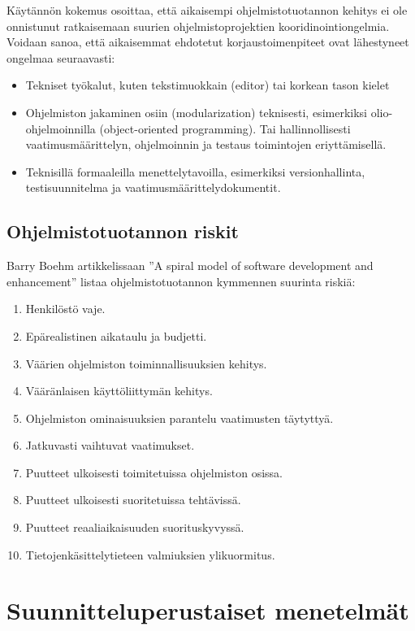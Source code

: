 \documentclass[finnish]{tktltiki2}
\theoremstyle{definition}
\theoremstyle{remark}
\begin{document}
Käytännön kokemus osoittaa, että aikaisempi ohjelmistotuotannon kehitys ei ole onnistunut ratkaisemaan suurien ohjelmistoprojektien kooridinointiongelmia. 
Voidaan sanoa, että aikaisemmat ehdotetut korjaustoimenpiteet ovat lähestyneet ongelmaa seuraavasti: 
\begin{itemize}
 \item Tekniset työkalut, kuten tekstimuokkain (editor) tai korkean tason kielet
 \item Ohjelmiston jakaminen osiin (modularization) teknisesti, esimerkiksi olio-ohjelmoinnilla (object-oriented programming). Tai hallinnollisesti vaatimusmäärittelyn, ohjelmoinnin ja testaus toimintojen eriyttämisellä.
 \item Teknisillä formaaleilla menettelytavoilla, esimerkiksi versionhallinta, testisuunnitelma ja vaatimusmäärittelydokumentit\cite{KES95}.
\end{itemize}

\subsection{Ohjelmistotuotannon riskit}

Barry Boehm artikkelissaan ''A spiral model of software development and enhancement'' listaa ohjelmistotuotannon kymmennen suurinta riskiä: 

\begin{enumerate}
  \item Henkilöstö vaje.
  \item Epärealistinen aikataulu ja budjetti.
  \item Väärien ohjelmiston toiminnallisuuksien kehitys.
  \item Vääränlaisen käyttöliittymän kehitys.
  \item Ohjelmiston ominaisuuksien parantelu vaatimusten täytyttyä.
  \item Jatkuvasti vaihtuvat vaatimukset.
  \item Puutteet ulkoisesti toimitetuissa ohjelmiston osissa.
  \item Puutteet ulkoisesti suoritetuissa tehtävissä.
  \item Puutteet reaaliaikaisuuden suorituskyvyssä.
  \item Tietojenkäsittelytieteen valmiuksien ylikuormitus\cite{BOE88}.
\end{enumerate}

\section{Suunnitteluperustaiset menetelmät}
\end{document}
